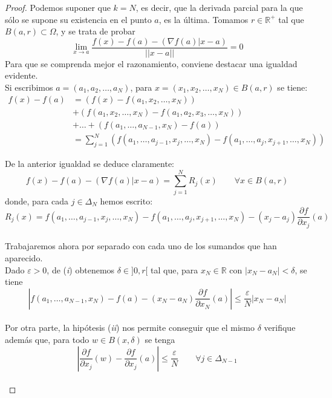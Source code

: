 \documentclass[a4paper, 12pt]{article}
\begin{document}
\begin{enumerate}[label=\textbf{\arabic*}.]
\begin{proof}
Podemos suponer que \(k = N\), es decir, que la derivada parcial para la que sólo se supone su existencia en el punto \(a\), es la última. Tomamos \(r \in \mathbb{R}^+\) tal que \(B(a,r) \subset \Omega\), y se trata de probar 
\[
	\lim_{x \to a} \frac{f(x) - f(a) - (\nabla f(a) | x-a)}{||x-a||} = 0
\]
Para que se comprenda mejor el razonamiento, conviene destacar una igualdad evidente. \\

Si escribimos \(a = (a_1, a_2, \dotsc, a_N)\), para \(x = (x_1, x_2, \dotsc, x_N) \in B(a,r)\) se tiene:
\[
\begin{array}{ll}
f(x) - f(a) &= (f(x) -f (a_1,x_2, \dotsc, x_N)) \\
&+ (f(a_1, x_2, \dotsc, x_N) - f(a_1, a_2, x_3, \dotsc, x_N)) \\
&+ \dotsc + (f(a_1, \dotsc, a_{N-1}, x_N) - f(a)) \\
&= \sum_{j=1}^{N} (f(a_1, \dotsc, a_{j-1}, x_j, \dotsc, x_N) - f(a_1, \dotsc, a_j, x_{j+1}, \dotsc, x_N))
\end{array}
\]

De la anterior igualdad se deduce claramente:
\begin{equation}\label{demos_1}
	f(x) - f(a) - (\nabla f(a) | x-a) = \sum_{j=1}^{N} R_j (x) \qquad \forall x \in B(a,r)
\end{equation}
donde, para cada \(j \in \Delta_N\) hemos escrito:
\begin{equation}\label{demos_2}
	R_j (x) = f(a_1, \dotsc, a_{j-1}, x_j, \dotsc, x_N) - f(a_1, \dotsc, a_j, x_{j+1}, \dotsc, x_N) - (x_j - a_j) \frac{\partial f}{\partial x_j} (a)
\end{equation} \\

Trabajaremos ahora por separado con cada uno de los sumandos que han aparecido. \\

Dado \(\varepsilon > 0\), de (\textit{i}) obtenemos \(\delta \in ]0, r[\) tal que, para \(x_N \in \mathbb{R}\) con \(|x_N - a_N| < \delta\), se tiene
\begin{equation}\label{demos_3}
	\left| f(a_1, \dotsc, a_{N-1}, x_N) - f(a) - (x_N - a_N) \frac{\partial f }{\partial x_N} (a) \right| \leq \frac{\varepsilon}{N} | x_N - a_N|
\end{equation} \\

Por otra parte, la hipótesis (\textit{ii}) nos permite conseguir que el mismo \(\delta\) verifique además que, para todo \(w \in B(x, \delta)\) se tenga
\begin{equation}\label{demos_4}
	\left| \frac{\partial f}{\partial x_j} (w) - \frac{\partial f}{\partial x_j} (a) \right| \leq \frac{\varepsilon}{N} \qquad \forall j \in \Delta_{N-1}
\end{equation} \\


\end{proof}
\end{enumerate}
\end{document}
